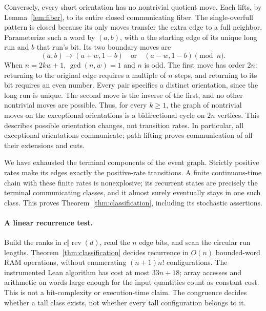 \documentclass[11pt]{article}
\theoremstyle{remark}
\newcommand{\rev}{\operatorname{rev}}
\begin{document}
Conversely, every short orientation has no nontrivial quotient move. Each lifts, by Lemma~\ref{lem:fiber}, to its entire closed communicating fiber. The single-overfull pattern is closed because its only moves transfer the extra edge to a full neighbor. Parameterize such a word by $(a,b)$, with $a$ the starting edge of its unique long run and $b$ that run's bit. Its two boundary moves are
\[
 (a,b)\longrightarrow(a+w,1-b)\quad\text{or}\quad(a-w,1-b)\pmod n.
\]
When $n=2kw+1$, $\gcd(n,w)=1$ and $n$ is odd. The first move has order $2n$: returning to the original edge requires a multiple of $n$ steps, and returning to its bit requires an even number. Every pair specifies a distinct orientation, since the long run is unique. The second move is the inverse of the first, and no other nontrivial moves are possible. Thus, for every $k\ge1$, the graph of nontrivial moves on the exceptional orientations is a bidirectional cycle on $2n$ vertices. This describes possible orientation changes, not transition rates. In particular, all exceptional orientations communicate; path lifting proves communication of all their extensions and cuts.

We have exhausted the terminal components of the event graph. Strictly positive rates make its edges exactly the positive-rate transitions. A finite continuous-time chain with these finite rates is nonexplosive; its recurrent states are precisely the terminal communicating classes, and it almost surely eventually stays in one such class. This proves Theorem~\ref{thm:classification}, including its stochastic assertions.

\paragraph{A linear recurrence test.}
Build the ranks in $c\Vert\rev(d)$, read the $n$ edge bits, and scan the circular run lengths. Theorem~\ref{thm:classification} decides recurrence in $O(n)$ bounded-word RAM operations, without enumerating $(n+1)n!$ configurations. The instrumented Lean algorithm has cost at most $33n+18$; array accesses and arithmetic on words large enough for the input quantities count as constant cost. This is not a bit-complexity or execution-time claim. The congruence decides whether a tall class exists, not whether every tall configuration belongs to it.
\end{document}
